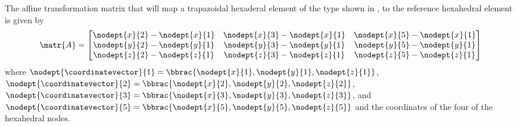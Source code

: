 
The affine transformation matrix that will map a trapazoidal hexaderal element of
the type shown in , to the
reference hexahedral element is given by
\begin{equation}
  \matr{A}=\begin{bmatrix}
  \nodept{x}{2}-\nodept{x}{1} & \nodept{x}{3}-\nodept{x}{1} & \nodept{x}{5}-\nodept{x}{1}\\
  \nodept{y}{2}-\nodept{y}{1} & \nodept{y}{3}-\nodept{y}{1} & \nodept{y}{5}-\nodept{y}{1}\\
  \nodept{z}{2}-\nodept{z}{1} & \nodept{z}{3}-\nodept{z}{1} & \nodept{z}{5}-\nodept{z}{1}
  \end{bmatrix}
  \label{eqn:HexahedralAffineTransformation}
\end{equation}
where
$\nodept{\coordinatevector}{1}=\bbrac{\nodept{x}{1},\nodept{y}{1},\nodept{z}{1}}$,
$\nodept{\coordinatevector}{2}=\bbrac{\nodept{x}{2},\nodept{y}{2},\nodept{z}{2}}$,
$\nodept{\coordinatevector}{3}=\bbrac{\nodept{x}{3},\nodept{y}{3},\nodept{z}{3}}$,
and
$\nodept{\coordinatevector}{5}=\bbrac{\nodept{x}{5},\nodept{y}{5},\nodept{z}{5}}$
and the coordinates of the four of the hexahedral nodes.

